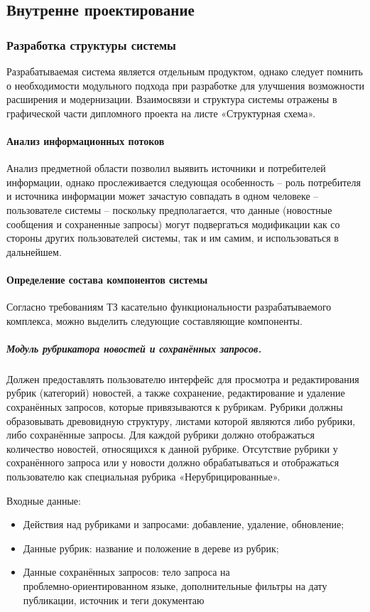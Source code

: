 \subsection{Внутренне проектирование}
\subsubsection{Разработка структуры системы}

Разрабатываемая система является отдельным продуктом, однако следует помнить о необходимости модульного подхода при разработке для улучшения возможности расширения и модернизации. Взаимосвязи и структура системы отражены в графической части дипломного проекта на листе «Структурная схема».

\paragraph{Анализ информационных потоков}

Анализ предметной области позволил выявить источники и потребителей информации, однако прослеживается следующая особенность -- роль потребителя и источника информации может зачастую совпадать в одном человеке -- пользователе системы -- поскольку предполагается, что данные (новостные сообщения и сохраненные запросы) могут подвергаться модификации как со стороны других пользователей системы, так и им самим, и использоваться в дальнейшем.

\paragraph{Определение состава компонентов системы}
Согласно требованиям ТЗ касательно функциональности разрабатываемого комплекса, можно выделить следующие составляющие компоненты.

\subparagraph{Модуль рубрикатора новостей и сохранённых запросов.}
Должен предоставлять пользователю интерфейс для просмотра и редактирования рубрик (категорий) новостей, а также сохранение, редактирование и удаление сохранённых запросов, которые привязываются к рубрикам. Рубрики должны образовывать древовидную структуру, листами которой являются либо рубрики, либо сохранённые запросы. Для каждой рубрики должно отображаться количество новостей, относящихся к данной рубрике. Отсутствие рубрики у сохранённого запроса или у новости должно обрабатываться и отображаться пользователю как специальная рубрика «Нерубрицированные».

Входные данные:
\begin{itemize}
\item Действия над рубриками и запросами: добавление, удаление, обновление;
\item Данные рубрик: название и положение в дереве из рубрик;
\item Данные сохранённых запросов: тело запроса на \\ проблемно-ориентированном языке, дополнительные фильтры на дату публикации, источник и теги документаю
\end{itemize}

